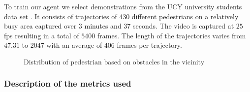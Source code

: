 To train our agent we select demonstrations from the UCY university students data set \cite{lerner_crowds_by_example_2007}. It consists of trajectories of 430 different pedestrians on a relatively busy area captured over $3$ minutes and $37$ seconds. The video is captured at $25$ fps resulting in a total of $5400$ frames. The length of the trajectories varies from $47.31$  to $2047$ with an average of $406$ frames per trajectory. 
\begin{figure}
	\caption {Distribution of pedestrian based on obstacles in the vicinity}
\end{figure}


%            

\subsubsection*{Description of the metrics used}
%

